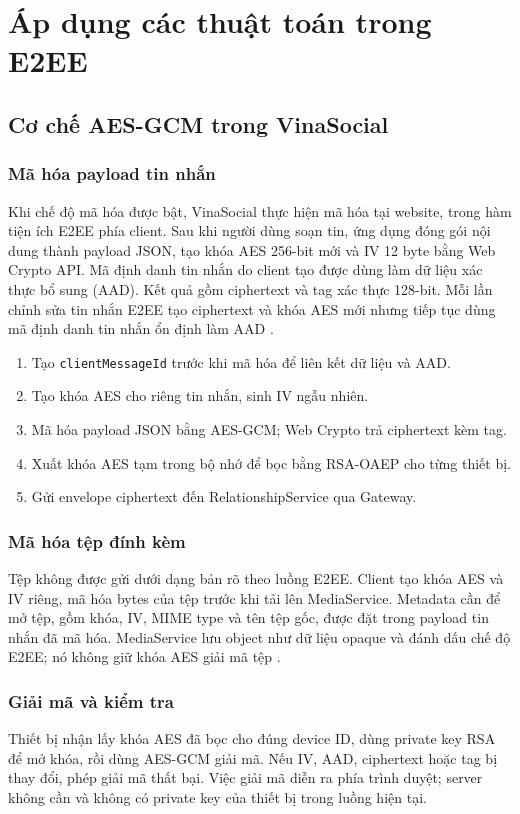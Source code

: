 \section{Áp dụng các thuật toán trong E2EE}
\subsection{Cơ chế AES-GCM trong VinaSocial}
\subsubsection{Mã hóa payload tin nhắn}
Khi chế độ mã hóa được bật, VinaSocial thực hiện mã hóa tại website, trong hàm tiện ích E2EE phía client. Sau khi người dùng soạn tin, ứng dụng đóng gói nội dung thành payload JSON, tạo khóa AES 256-bit mới và IV 12 byte bằng Web Crypto API. Mã định danh tin nhắn do client tạo được dùng làm dữ liệu xác thực bổ sung (AAD). Kết quả gồm ciphertext và tag xác thực 128-bit. Mỗi lần chỉnh sửa tin nhắn E2EE tạo ciphertext và khóa AES mới nhưng tiếp tục dùng mã định danh tin nhắn ổn định làm AAD \cite{e2ee}.

\begin{enumerate}
\item Tạo \texttt{clientMessageId} trước khi mã hóa để liên kết dữ liệu và AAD.
\item Tạo khóa AES cho riêng tin nhắn, sinh IV ngẫu nhiên.
\item Mã hóa payload JSON bằng AES-GCM; Web Crypto trả ciphertext kèm tag.
\item Xuất khóa AES tạm trong bộ nhớ để bọc bằng RSA-OAEP cho từng thiết bị.
\item Gửi envelope ciphertext đến RelationshipService qua Gateway.
\end{enumerate}

\subsubsection{Mã hóa tệp đính kèm}
Tệp không được gửi dưới dạng bản rõ theo luồng E2EE. Client tạo khóa AES và IV riêng, mã hóa bytes của tệp trước khi tải lên MediaService. Metadata cần để mở tệp, gồm khóa, IV, MIME type và tên tệp gốc, được đặt trong payload tin nhắn đã mã hóa. MediaService lưu object như dữ liệu opaque và đánh dấu chế độ E2EE; nó không giữ khóa AES giải mã tệp \cite{e2ee}.

\subsubsection{Giải mã và kiểm tra}
Thiết bị nhận lấy khóa AES đã bọc cho đúng device ID, dùng private key RSA để mở khóa, rồi dùng AES-GCM giải mã. Nếu IV, AAD, ciphertext hoặc tag bị thay đổi, phép giải mã thất bại. Việc giải mã diễn ra phía trình duyệt; server không cần và không có private key của thiết bị trong luồng hiện tại.

